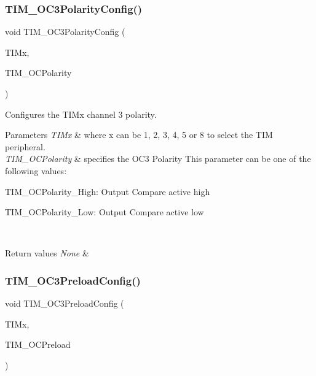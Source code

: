 \subsubsection{\texorpdfstring{TIM\_OC3PolarityConfig()}{TIM\_OC3PolarityConfig()}}
{\footnotesize\ttfamily void T\+I\+M\+\_\+\+O\+C3\+Polarity\+Config (\begin{DoxyParamCaption}\item[{\mbox{\hyperlink{struct_t_i_m___type_def}{T\+I\+M\+\_\+\+Type\+Def}} $\ast$}]{T\+I\+Mx,  }\item[{uint16\+\_\+t}]{T\+I\+M\+\_\+\+O\+C\+Polarity }\end{DoxyParamCaption})}



Configures the T\+I\+Mx channel 3 polarity. 


\begin{DoxyParams}{Parameters}
{\em T\+I\+Mx} & where x can be 1, 2, 3, 4, 5 or 8 to select the T\+IM peripheral. \\
\hline
{\em T\+I\+M\+\_\+\+O\+C\+Polarity} & specifies the O\+C3 Polarity This parameter can be one of the following values\+: \begin{DoxyItemize}
\item T\+I\+M\+\_\+\+O\+C\+Polarity\+\_\+\+High\+: Output Compare active high \item T\+I\+M\+\_\+\+O\+C\+Polarity\+\_\+\+Low\+: Output Compare active low \end{DoxyItemize}
\\
\hline
\end{DoxyParams}

\begin{DoxyRetVals}{Return values}
{\em None} & \\
\hline
\end{DoxyRetVals}
\mbox{\label{group___t_i_m___exported___functions_ga8b2391685a519e60e596b7d596f86f09}} 
\subsubsection{\texorpdfstring{TIM\_OC3PreloadConfig()}{TIM\_OC3PreloadConfig()}}
{\footnotesize\ttfamily void T\+I\+M\+\_\+\+O\+C3\+Preload\+Config (\begin{DoxyParamCaption}\item[{\mbox{\hyperlink{struct_t_i_m___type_def}{T\+I\+M\+\_\+\+Type\+Def}} $\ast$}]{T\+I\+Mx,  }\item[{uint16\+\_\+t}]{T\+I\+M\+\_\+\+O\+C\+Preload }\end{DoxyParamCaption})}



